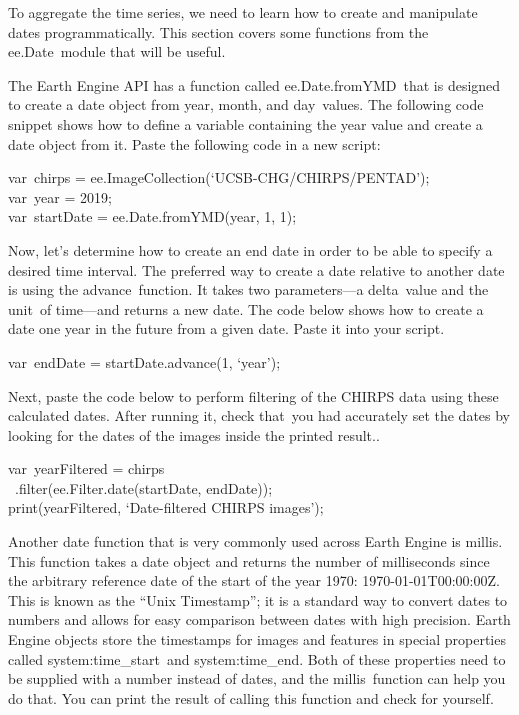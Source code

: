 \documentclass[
  letterpaper,
  DIV=11,
  numbers=noendperiod]{scrreprt}
\begin{document}
To aggregate the time series, we need to learn how to create and
manipulate dates programmatically. This section covers some functions
from the ee.Date~module that will be useful.

The Earth Engine API has a function called ee.Date.fromYMD~that is
designed to create a date object from year, month, and day~values. The
following code snippet shows how to define a variable containing the
year value and create a date object from it. Paste the following code in
a new script:

var~chirps = ee.ImageCollection(`UCSB-CHG/CHIRPS/PENTAD');\\
var~year = 2019;\\
var~startDate = ee.Date.fromYMD(year, 1, 1);

Now, let's determine how to create an end date in order to be able to
specify a desired time interval. The preferred way to create a date
relative to another date is using the advance~function. It takes two
parameters---a delta~value and the unit~of time---and returns a new
date. The code below shows how to create a date one year in the future
from a given date. Paste it into your script.

var~endDate = startDate.advance(1, `year');

Next, paste the code below to perform filtering of the CHIRPS data using
these calculated dates. After running it, check that~you had accurately
set the dates by looking for the dates of the images inside the printed
result..

var~yearFiltered = chirps\\
\hspace*{0.333em} ~.filter(ee.Filter.date(startDate, endDate));\\
print(yearFiltered, `Date-filtered CHIRPS images');

Another date function that is very commonly used across Earth Engine is
millis. This function takes a date object and returns the number of
milliseconds since the arbitrary reference date of the start of the year
1970: 1970-01-01T00:00:00Z. This is known as the ``Unix Timestamp''; it
is a standard way to convert dates to numbers and allows for easy
comparison between dates with high precision. Earth Engine objects store
the timestamps for images and features in special properties called
system:time\_start~and system:time\_end. Both of these properties need
to be supplied with a number instead of dates, and the millis~function
can help you do that. You can print the result of calling this function
and check for yourself.
\end{document}
